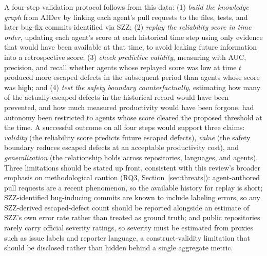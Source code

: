 A four-step validation protocol follows from this data: (1)
\emph{build the knowledge graph} from AIDev by linking each agent's
pull requests to the files, tests, and later bug-fix commits
identified via SZZ; (2) \emph{replay the reliability score in time
order}, updating each agent's score at each historical time step using
only evidence that would have been available at that time, to avoid
leaking future information into a retrospective score; (3)
\emph{check predictive validity}, measuring with AUC, precision, and
recall whether agents whose replayed score was low at time $t$
produced more escaped defects in the subsequent period than agents
whose score was high; and (4) \emph{test the safety boundary
counterfactually}, estimating how many of the actually-escaped defects
in the historical record would have been prevented, and how much
measured productivity would have been forgone, had autonomy been
restricted to agents whose score cleared the proposed threshold at
the time. A successful outcome on all four steps would support three
claims: \emph{validity} (the reliability score predicts future
escaped defects), \emph{value} (the safety boundary reduces escaped
defects at an acceptable productivity cost), and \emph{generalization}
(the relationship holds across repositories, languages, and agents).
Three limitations should be stated up front, consistent with this
review's broader emphasis on methodological caution (RQ3,
Section~\ref{sec:threats}): agent-authored pull requests are a recent
phenomenon, so the available history for replay is short;
SZZ-identified bug-inducing commits are known to include labeling
errors, so any SZZ-derived escaped-defect count should be reported
alongside an estimate of SZZ's own error rate rather than treated as
ground truth; and public repositories rarely carry official severity
ratings, so severity must be estimated from proxies such as issue
labels and reporter language, a construct-validity limitation that
should be disclosed rather than hidden behind a single aggregate
metric.

